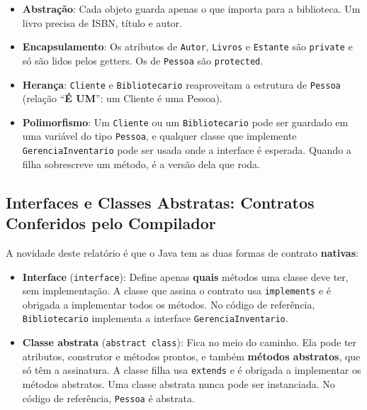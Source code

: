 \begin{itemize}
    \item \textbf{Abstração}: Cada objeto guarda apenas o que importa para a biblioteca. Um
    livro precisa de ISBN, título e autor.

    \item \textbf{Encapsulamento}: Os atributos de \texttt{Autor}, \texttt{Livros} e
    \texttt{Estante} são \texttt{private} e só são lidos pelos getters. Os de \texttt{Pessoa} são
    \texttt{protected}.

    \item \textbf{Herança}: \texttt{Cliente} e \texttt{Bibliotecario} reaproveitam a estrutura de
    \texttt{Pessoa} (relação ``\textbf{É UM}'': um Cliente é uma Pessoa).

    \item \textbf{Polimorfismo}: Um \texttt{Cliente} ou um \texttt{Bibliotecario} pode ser
    guardado em uma variável do tipo \texttt{Pessoa}, e qualquer classe que implemente
    \texttt{GerenciaInventario} pode ser usada onde a interface é esperada. Quando a filha
    sobrescreve um método, é a versão dela que roda.
\end{itemize}

\subsection{Interfaces e Classes Abstratas: Contratos Conferidos pelo Compilador}

A novidade deste relatório é que o Java tem as duas formas de contrato \textbf{nativas}:

\begin{itemize}
    \item \textbf{Interface} (\texttt{interface}): Define apenas \textbf{quais} métodos uma
    classe deve ter, sem implementação. A classe que assina o contrato usa \texttt{implements}
    e é obrigada a implementar todos os métodos. No código de referência, \texttt{Bibliotecario}
    implementa a interface \texttt{GerenciaInventario}.

    \item \textbf{Classe abstrata} (\texttt{abstract class}): Fica no meio do caminho. Ela pode
    ter atributos, construtor e métodos prontos, e também \textbf{métodos abstratos}, que só têm
    a assinatura. A classe filha usa \texttt{extends} e é obrigada a implementar os métodos
    abstratos. Uma classe abstrata nunca pode ser instanciada. No código de referência,
    \texttt{Pessoa} é abstrata.
\end{itemize}

